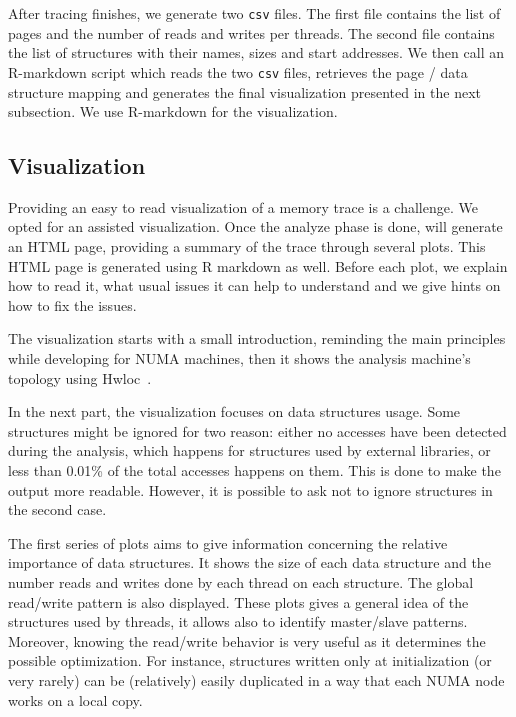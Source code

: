 After tracing finishes, we generate two \texttt{csv} files.
The first file contains the list of pages and the number of reads
and writes per threads. The second file contains the
list of structures with their names, sizes and start addresses.
We then call an R-markdown script which reads the two \texttt{csv} files,
retrieves the page / data structure mapping and generates the final
visualization presented in the next subsection. We use R-markdown
for the visualization.


\subsection{Visualization}
\label{sec:design-visu}

Providing an easy to read visualization of a memory trace is a challenge. We opted for an
assisted visualization. Once the analyze phase is done, \TABARNAC will
generate an HTML page, providing a summary of the trace through several plots.
This HTML page is generated using R markdown as well.
Before each plot, we explain how to read it, what
usual issues it can help to understand and we give hints on how to fix the issues.

The visualization starts with a small introduction, reminding the main
principles while developing for NUMA machines, then it shows the analysis
machine's topology using Hwloc~\cite{Broquedis10hwloc}.

In the next part, the visualization focuses on data structures usage. Some structures might
be ignored for two reason: either no accesses have been detected during the
analysis, which happens for structures used by external libraries, or less than 0.01\% of the total accesses happens on them. This is done to make the output
more readable. However, it is possible to ask \TABARNAC not to ignore
structures in the second case.

The first series of plots aims to give information concerning the relative
importance of data structures. It shows the size of each data structure and the
number reads and writes done by each thread on each structure. The global
read/write pattern is also displayed. These plots gives a general idea of the
structures used by threads, it allows also to identify master/slave patterns.
Moreover, knowing the read/write behavior is very useful as it determines the
possible optimization. For instance, structures written only at initialization
(or very rarely) can be (relatively) easily duplicated in a way that each NUMA
node works on a local copy.

